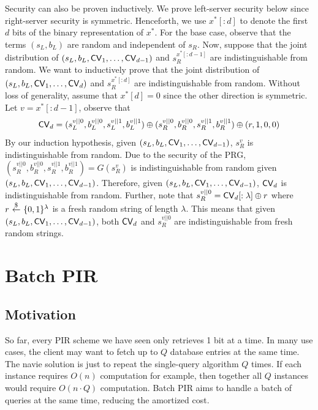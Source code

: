 
Security can also be proven inductively.
We prove left-server security below since right-server security is symmetric.
Henceforth, we use $x^*[:d]$ to denote the first $d$ bits of the
binary representation of $x^*$.
For the base case, observe that the terms $(s_L, b_L)$  are random
and independent of $s_R$. 
Now, suppose that 
the joint distribution of $(s_L, b_L, {\sf CV}_1, \ldots, {\sf CV}_{d-1})$
and  $s_R^{x^*[:d-1]}$ are indistinguishable from random. 
We want to inductively prove that 
the joint distribution of $(s_L, b_L, {\sf CV}_1, \ldots, {\sf CV}_d)$
and  $s_R^{x^*[:d]}$ are indistinguishable from random.
Without loss of generality, assume that $x^*[d] = 0$
since the other direction is symmetric.
Let $v = x^*[:d-1]$, observe
that 
\[\CV_d = 
(s_L^{v||0}, b_L^{v||0}, s_L^{v||1}, b_L^{v||1}) \xor 
(s_R^{v||0}, b_R^{v||0}, s_R^{v||1}, b_R^{v||1}) \xor 
(r, 1, 0, 0) %
\]
By our induction hypothesis, given $(s_L, b_L, {\sf CV}_1, \ldots, {\sf CV}_{d-1})$,
$s_R^v$ is indistinguishable from random.
Due to the security of the PRG, 
$(s_R^{v||0}, b_R^{v||0}, s_R^{v||1}, b_R^{v||1}) = G(s_R^v)$ 
is indistinguishable from random 
given $(s_L, b_L, {\sf CV}_1, \ldots, {\sf CV}_{d-1})$.
Therefore, given 
$(s_L, b_L, {\sf CV}_1, \ldots, {\sf CV}_{d-1})$,
${\sf CV}_d$ 
is indistinguishable from random.
Further, note that $s_R^{v||0} = {\sf CV}_d[:\lambda] \oplus r$
where $r ~{\overset{\$}{\leftarrow}}~ \{0, 1\}^\lambda$ is a fresh random string
of length $\lambda$.
This means that 
given $(s_L, b_L, {\sf CV}_1, \ldots, {\sf CV}_{d-1})$, 
both ${\sf CV}_d$ and $s_R^{v||0}$
are indistinguishable from fresh random strings.





 \section{Batch PIR}

 \subsection{Motivation}
    So far, every PIR scheme we have seen only retrieves 1 bit at a time. 
    In many use cases, the client may want to fetch up to $Q$ database entries at the same time. 
    The navie solution is just to repeat the single-query algorithm $Q$ times.
If each instance
requires $O(n)$ computation for example,
then together all $Q$ instances 
would require $O(n \cdot Q)$ computation.
Batch PIR aims to handle a batch of queries at the same time, 
reducing the amortized cost.

